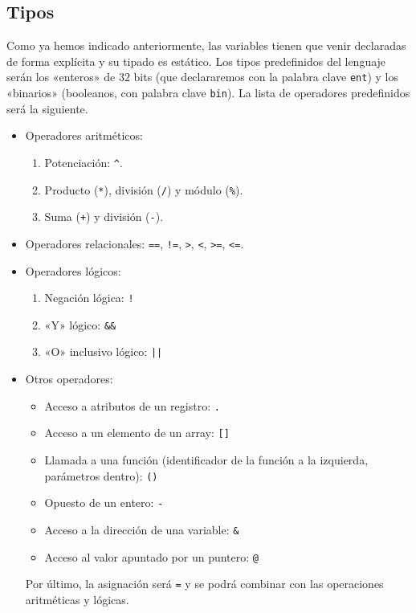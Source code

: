 \subsection{Tipos}
Como ya hemos indicado anteriormente, las variables tienen que venir declaradas
de forma explícita y su tipado es estático. Los tipos predefinidos del lenguaje
serán los «enteros» de $32$ bits (que declararemos con la palabra clave
\lstinline{ent}) y los «binarios» (booleanos, con palabra clave
\lstinline{bin}). La lista de operadores predefinidos será la siguiente.
\begin{itemize}
\item Operadores aritméticos:
    \begin{enumerate}
        \item Potenciación: \lstinline{^}.
        \item Producto (\lstinline{*}), división (\lstinline{/}) y módulo (\lstinline{%}).
        \item Suma (\lstinline{+}) y división (\lstinline{-}).
    \end{enumerate}
\item Operadores relacionales: \lstinline{==}, \lstinline{!=}, \lstinline{>}, \lstinline{<},
    \lstinline{>=}, \lstinline{<=}.

\item Operadores lógicos:
\begin{enumerate}
    \item Negación lógica: \lstinline{!}
    \item «Y» lógico: \lstinline{&&}
    \item «O» inclusivo lógico: \lstinline{||}
\end{enumerate}

\item Otros operadores:
\begin{itemize}
    \item Acceso a atributos de un registro: \lstinline{.}
    \item Acceso a un elemento de un array: \lstinline{[]}
    \item Llamada a una función (identificador de la función a la izquierda,
        parámetros dentro): \lstinline{()}
    \item Opuesto de un entero: \lstinline{-}
    \item Acceso a la dirección de una variable: \lstinline{&}
    \item Acceso al valor apuntado por un puntero: \lstinline{@}
\end{itemize}
Por último, la asignación será \lstinline{=} y se podrá combinar con las
operaciones aritméticas y lógicas.
\end{itemize}
